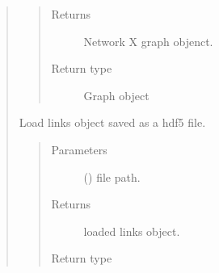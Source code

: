 \documentclass[letterpaper,10pt,english]{sphinxmanual}
\begin{document}
\begin{quote}
\begin{fulllineitems}
\begin{quote}
\begin{description}
\item[{Returns}] \leavevmode
Network X graph objenct.

\item[{Return type}] \leavevmode
Graph object

\end{description}\end{quote}

\end{fulllineitems}


\begin{fulllineitems}
\label{\detokenize{modules/celloracle.network_analysis:celloracle.network_analysis.load_links}}
Load links object saved as a hdf5 file.
\begin{quote}\begin{description}
\item[{Parameters}] \leavevmode
{} () \textendash{} file path.

\item[{Returns}] \leavevmode
loaded links object.

\item[{Return type}] \leavevmode
{\hyperref[\detokenize{modules/celloracle:celloracle.Links}]{}}

\end{description}\end{quote}

\end{fulllineitems}


\begin{fulllineitems}
\label{\detokenize{modules/celloracle.network_analysis:celloracle.network_analysis.set_R_path}}
\end{fulllineitems}


\end{quote}
\end{document}
